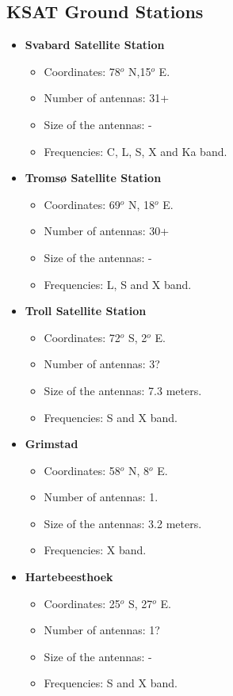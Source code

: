 \subsection{KSAT Ground Stations}
\begin{itemize}
\item \textbf{Svabard Satellite Station}
\begin{itemize}
\item Coordinates: 78$^{o}$ N,15$^{o}$ E.
\item Number of antennas: 31+
\item Size of the antennas: -
\item Frequencies: C, L, S, X and Ka band.
\end{itemize}
\item \textbf{Tromsø Satellite Station}
\begin{itemize}
\item Coordinates: 69$^{o}$ N, 18$^{o}$ E.
\item Number of antennas: 30+
\item Size of the antennas: -
\item Frequencies: L, S and X band.
\end{itemize}
\item \textbf{Troll Satellite Station}
\begin{itemize}
\item Coordinates: 72$^{o}$ S, 2$^{o}$ E.
\item Number of antennas: 3?
\item Size of the antennas: 7.3 meters.
\item Frequencies: S and X band.
\end{itemize}
\item \textbf{Grimstad}
\begin{itemize}
\item Coordinates: 58$^{o}$ N, 8$^{o}$ E.
\item Number of antennas: 1.
\item Size of the antennas: 3.2 meters.
\item Frequencies: X band.
\end{itemize}
\item \textbf{Hartebeesthoek}
\begin{itemize}
\item Coordinates: 25$^{o}$ S, 27$^{o}$ E.
\item Number of antennas: 1?
\item Size of the antennas: -
\item Frequencies: S and X band.

\end{itemize}
\end{itemize}
